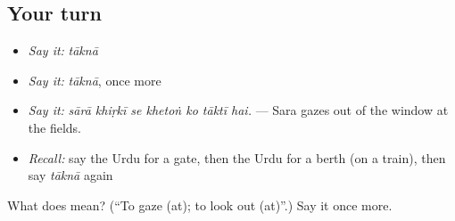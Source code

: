\subsection*{Your turn}
\begin{itemize}
\raggedright
  \item \emph{Say it:} \emph{tāknā}
  \item \emph{Say it:} \emph{tāknā}, once more
  \item \emph{Say it:} \emph{sārā khiṛkī se khetoṅ ko tāktī hai.} — Sara gazes out of the window at the fields.
  \item \emph{Recall:} say the Urdu for a gate, then the Urdu for a berth (on a train), then say \emph{tāknā} again
\end{itemize}

\begin{tcolorbox}[breakable,colback=teal!4,colframe=teal!35!black,title={Before you move on}]
What does  mean? (\textquotedblleft{}To gaze (at); to look out (at)\textquotedblright{}.) Say it once more.
\end{tcolorbox}
